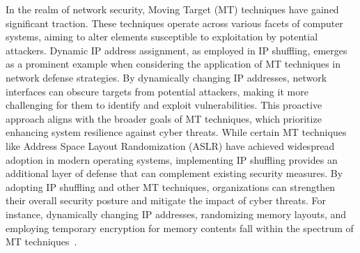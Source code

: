 In the realm of network security, Moving Target (MT) techniques have gained significant traction. These techniques operate across various facets of computer systems, aiming to alter elements susceptible to exploitation by potential attackers. Dynamic IP address assignment, as employed in IP shuffling, emerges as a prominent example when considering the application of MT techniques in network defense strategies. By dynamically changing IP addresses, network interfaces can obscure targets from potential attackers, making it more challenging for them to identify and exploit vulnerabilities.
This proactive approach aligns with the broader goals of MT techniques, which prioritize enhancing system resilience against cyber threats. While certain MT techniques like Address Space Layout Randomization (ASLR) have achieved widespread adoption in modern operating systems, implementing IP shuffling provides an additional layer of defense that can complement existing security measures. By adopting IP shuffling and other MT techniques, organizations can strengthen their overall security posture and mitigate the impact of cyber threats.
For instance, dynamically changing IP addresses, randomizing memory layouts, and employing temporary encryption for memory contents fall within the spectrum of MT techniques~\cite{okhravi2013finding}.